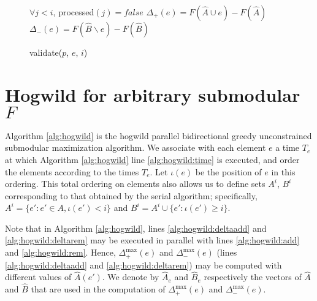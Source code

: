 \documentclass{article} %
\begin{document}
\begin{figure}[h]
\begin{multicols}{2}
\begin{minipage}{0.49\textwidth}
\begin{algorithm}[H]
\DontPrintSemicolon
\caption{validate($p$, $e$, $i$)}
\label{alg:occvalidate}
  \WaitUntil $\forall j < i$, processed$(j) = false$\;
  $\Delta_+(e) = F(\hat{A} \cup e) - F(\hat{A})$\;
  $\Delta_-(e) = F(\hat{B} \backslash e) - F(\hat{B})$\;
\end{algorithm}


  \label{fig:submax}
    \end{minipage}
    
    
    
  \end{multicols}
\end{figure}








\section{Hogwild for arbitrary submodular $F$}
Algorithm \ref{alg:hogwild} is the hogwild parallel bidirectional greedy unconstrained submodular maximization algorithm.
We associate with each element $e$ a time $T_e$ at which Algorithm \ref{alg:hogwild} line \ref{alg:hogwild:time} is executed, and order the elements according to the times $T_e$.
Let $\iota(e)$ be the position of $e$ in this ordering.
This total ordering on elements also allows us to define sets $A^i$, $B^i$ corresponding to that obtained by the serial algorithm;
specifically, $A^i = \{e' : e' \in A, \iota(e') < i\}$ and $B^i = A^i \cup \{e': \iota(e') \geq i\}$.

Note that in Algorithm \ref{alg:hogwild}, lines \ref{alg:hogwild:deltaadd} and \ref{alg:hogwild:deltarem} may be executed in parallel with lines \ref{alg:hogwild:add} and \ref{alg:hogwild:rem}.
Hence, $\Delta_+^{\max}(e)$ and $\Delta_-^{\max}(e)$ (lines \ref{alg:hogwild:deltaadd} and \ref{alg:hogwild:deltarem}) may be computed with different values of $\hat{A}(e')$.
We denote by $\hat{A}_e$ and $\hat{B}_e$ respectively the vectors of $\hat{A}$ and $\hat{B}$ that are used in the computation of $\Delta_+^{\max}(e)$ and $\Delta_-^{\max}(e)$.
\end{document}
